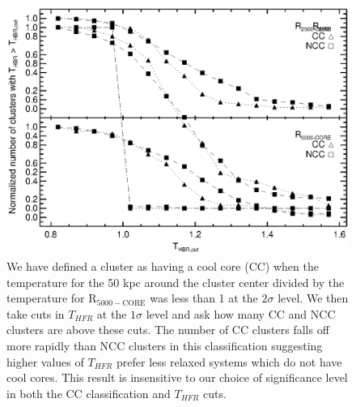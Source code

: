 \documentclass{emulateapj}
\newcommand{\tf}{T_{HFR} }
\begin{document}
{\clearpage
\begin{figure}[htp]
\begin{center}
\includegraphics[scale=1.0]{cc_ncc_bin}
\caption{\small We have defined a cluster as having a cool core (CC)
when the temperature for the 50 kpc around the cluster center divided
by the temperature for R$_{5000-\text{CORE}}$ was less than 1 at the
$2\sigma$ level. We then take cuts in $\tf$ at the $1\sigma$
level and ask how many CC and NCC clusters are above these cuts. The
number of CC clusters falls off more rapidly than NCC clusters in this
classification suggesting higher values of $\tf$ prefer less
relaxed systems which do not have cool cores. This result is
insensitive to our choice of significance level in both the CC
classification and $\tf$ cuts.}
\label{fig:cc_ncc_bin}
\end{center}
\end{figure}


}
\end{document}
